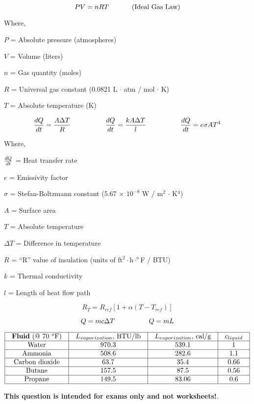 

$$PV = nRT \hbox{ \hskip 30pt (Ideal Gas Law)}$$

\noindent
Where,

$P$ = Absolute pressure (atmospheres)

$V$ = Volume (liters)

$n$ = Gas quantity (moles)

$R$ = Universal gas constant (0.0821 L $\cdot$ atm / mol $\cdot$ K)

$T$ = Absolute temperature (K)

\vskip 50pt

$${dQ \over dt} = {{A \Delta T} \over R} \hskip 50pt {dQ \over dt} = {{k A \Delta T} \over l} \hskip 50pt {dQ \over dt} = e \sigma A T^4$$

\noindent
Where,

$dQ \over dt$ = Heat transfer rate 

$e$ = Emissivity factor 

$\sigma$ = Stefan-Boltzmann constant (5.67 $\times$ $10^{-8}$ W / m$^{2}$ $\cdot$ K$^{4}$)

$A$ = Surface area 

$T$ = Absolute temperature 

$\Delta T$ = Difference in temperature

$R$ = ``R'' value of insulation (units of ft$^{2} \cdot$h$\cdot ^{o}$F / BTU)

$k$ = Thermal conductivity

$l$ = Length of heat flow path

\vskip 50pt

$$R_T = R_{ref} \left[1 + \alpha (T - T_{ref}) \right]$$

\vskip 10pt

$$Q = mc \Delta T \hskip 50 pt Q = mL$$

\vskip 10pt


$$\vbox{\offinterlineskip
\halign{\strut
\vrule \quad\hfil # \ \hfil & 
\vrule \quad\hfil # \ \hfil & 
\vrule \quad\hfil # \ \hfil & 
\vrule \quad\hfil # \ \hfil \vrule \cr
\noalign{\hrule}
%
{\bf Fluid} (@ 70 $^{o}$F) & $L_{vaporization}$, BTU/lb & $L_{vaporization}$, cal/g & $c_{liquid}$ \cr
%
\noalign{\hrule}
%
Water & 970.3 & 539.1 & 1 \cr
%
\noalign{\hrule}
%
Ammonia & 508.6 & 282.6 & 1.1 \cr
%
\noalign{\hrule}
%
Carbon dioxide & 63.7 & 35.4 & 0.66 \cr
%
\noalign{\hrule}
%
Butane & 157.5 & 87.5 & 0.56 \cr
%
\noalign{\hrule}
%
Propane & 149.5 & 83.06 & 0.6 \cr
%
\noalign{\hrule}
} %
}$$ %















{\bf This question is intended for exams only and not worksheets!}.



